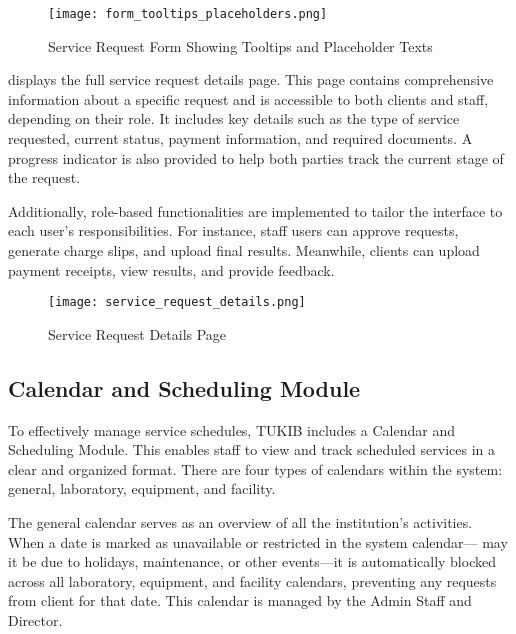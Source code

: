 \begin{figure}[h]
	\centering 
	\texttt{[image: form\_tooltips\_placeholders.png]}
	\caption{Service Request Form Showing Tooltips and Placeholder Texts}
	\label{fig:form_tooltips_placeholders}
\end{figure}

\newpage

 displays the full service request details page. This page contains comprehensive information about a specific request and is accessible to both clients and staff, depending on their role. It includes key details such as the type of service requested, current status, payment information, and required documents. A progress indicator is also provided to help both parties track the current stage of the request.

Additionally, role-based functionalities are implemented to tailor the interface to each user's responsibilities. For instance, staff users can approve requests, generate charge slips, and upload final results. Meanwhile, clients can upload payment receipts, view results, and provide feedback.

\newpage

\begin{figure}[h]
	\centering 
	\texttt{[image: service\_request\_details.png]}
	\caption{Service Request Details Page}
	\label{fig:service_request_details}
\end{figure}

\newpage

\subsection{Calendar and Scheduling Module}

To effectively manage service schedules, TUKIB includes a Calendar and Scheduling Module. This enables staff to view and track scheduled services in a clear and organized format. There are four types of calendars within the system: general, laboratory, equipment, and facility.

The general calendar serves as an overview of all the institution's activities. When a date is marked as unavailable or restricted in the system calendar— may it be due to holidays, maintenance, or other events—it is automatically blocked across all laboratory, equipment, and facility calendars, preventing any requests from client for that date. This calendar is managed by the Admin Staff and Director.

